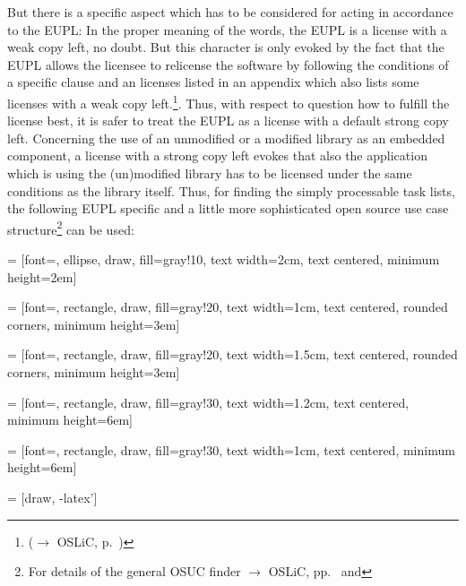 But there is a specific aspect which has to be considered for acting in
accordance to the EUPL: In the proper meaning of the words, the EUPL is a
license with a weak copy left, no doubt. But this character is only evoked by
the fact that the EUPL allows the licensee to relicense the software by
following the conditions of a specific clause and an licenses listed in an
appendix which also lists some licenses with a weak copy
left.\footnote{($\rightarrow$ OSLiC, p.\ \pageref{sec:ProtectingPowerOfEupl})}.
Thus, with respect to question how to fulfill the license best, it is safer to
treat the EUPL as a license with a default strong copy left. Concerning the use
of an unmodified or a modified library as an embedded component, a license with
a strong copy left evokes that also the application which is using the
(un)modified library has to be licensed under the same conditions as the library
itself. Thus, for finding the simply processable task lists, the following EUPL
specific and a little more sophisticated open source use case
structure\footnote{For details of the general OSUC finder $\rightarrow$ OSLiC,
pp.\ \pageref{OsucTokens} and \pageref{OsucDefinitionTree}} can be used:
 
 
 
 = [font=\scriptsize, ellipse, draw, fill=gray!10, 
    text width=2cm, text centered, minimum height=2em]

 = [font=\tiny, rectangle, draw, fill=gray!20, 
    text width=1cm, text centered, rounded corners, minimum height=3em]

 = [font=\tiny, rectangle, draw, fill=gray!20, 
    text width=1.5cm, text centered, rounded corners, minimum height=3em]
    
 = [font=\tiny, rectangle, draw, fill=gray!30, 
    text width=1.2cm, text centered, minimum height=6em]

 = [font=\tiny, rectangle, draw, fill=gray!30, 
    text width=1cm, text centered, minimum height=6em]


 = [draw, -latex']


